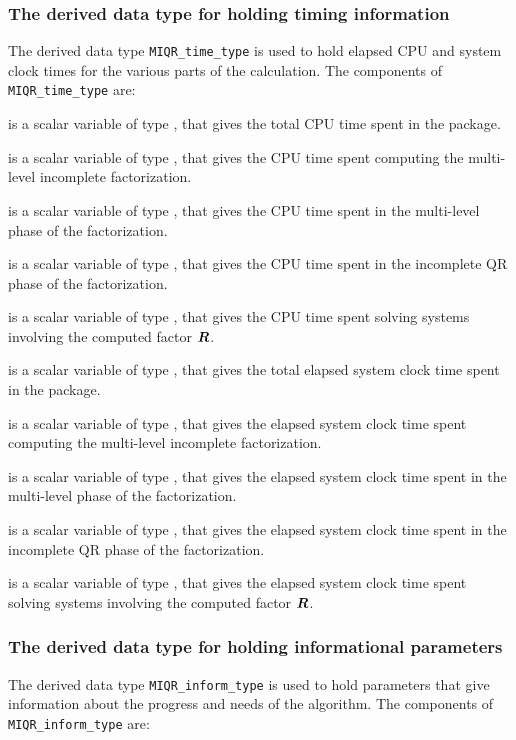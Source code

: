 \documentclass{galahad}
\newcommand{\packagename}{MIQR}
\begin{document}

\subsubsection{The derived data type for holding timing 
 information}\label{typetime}
The derived data type 
{\tt \packagename\_time\_type} 
is used to hold elapsed CPU and system clock times for the various parts of 
the calculation. The components of 
{\tt \packagename\_time\_type} 
are:
\begin{description}
 is a scalar variable of type \realdp, that gives
 the total CPU time spent in the package.

 is a scalar variable of type \realdp, that gives
 the CPU time spent computing the multi-level incomplete factorization.

 is a scalar variable of type \realdp, that gives
 the CPU time spent in the multi-level phase of the factorization.

 is a scalar variable of type \realdp, that gives
 the CPU time spent in the incomplete QR phase of the factorization.

 is a scalar variable of type \realdp, that gives
 the CPU time spent  solving systems involving the computed factor ${\bm{R}}$.

 is a scalar variable of type \realdp, that gives
 the total elapsed system clock time spent in the package.

 is a scalar variable of type \realdp, that gives
 the elapsed system clock time spent computing the multi-level incomplete 
factorization.

 is a scalar variable of type \realdp, that gives
 the elapsed system clock time spent in the multi-level phase of the 
factorization.

 is a scalar variable of type \realdp, that gives
the elapsed system clock time spent in the incomplete QR phase of the 
factorization.

 is a scalar variable of type \realdp, that gives
 the elapsed system clock time spent solving systems involving the computed 
factor ${\bm{R}}$.

\end{description}



\subsubsection{The derived data type for holding informational
 parameters}\label{typeinform}
The derived data type 
{\tt \packagename\_inform\_type} 
is used to hold parameters that give information about the progress and needs 
of the algorithm. The components of 
{\tt \packagename\_inform\_type} 
are:
\end{document}
